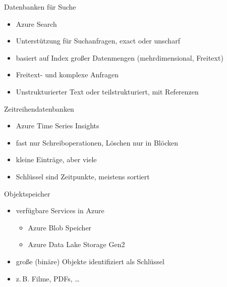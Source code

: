 \begin{flashcard}[Definition]{Datenbanken für Suche}
  \begin{itemize}
    \item Azure Search
    \item Unterstützung für Suchanfragen, exact oder unscharf
    \item basiert auf Index großer Datenmengen (mehrdimensional, Freitext)
    \item Freitext- und komplexe Anfragen
    \item Unstrukturierter Text oder teilstrukturiert, mit Referenzen
  \end{itemize}
\end{flashcard}

\begin{flashcard}[Definition]{Zeitreihendatenbanken}
  \begin{itemize}
    \item Azure Time Series Insights
    \item fast nur Schreiboperationen, Löschen nur in Blöcken
    \item kleine Einträge, aber viele
    \item Schlüssel sind Zeitpunkte, meistens sortiert
  \end{itemize}
\end{flashcard}

\begin{flashcard}[Definition]{Objektspeicher}
  \begin{itemize}
    \item verfügbare Services in Azure
      \begin{itemize}
        \item Azure Blob Speicher
        \item Azure Data Lake Storage Gen2
      \end{itemize}
      \item große (binäre) Objekte identifiziert als Schlüssel
      \item z.\,B. Filme, PDFs, \ldots
  \end{itemize}
\end{flashcard}

